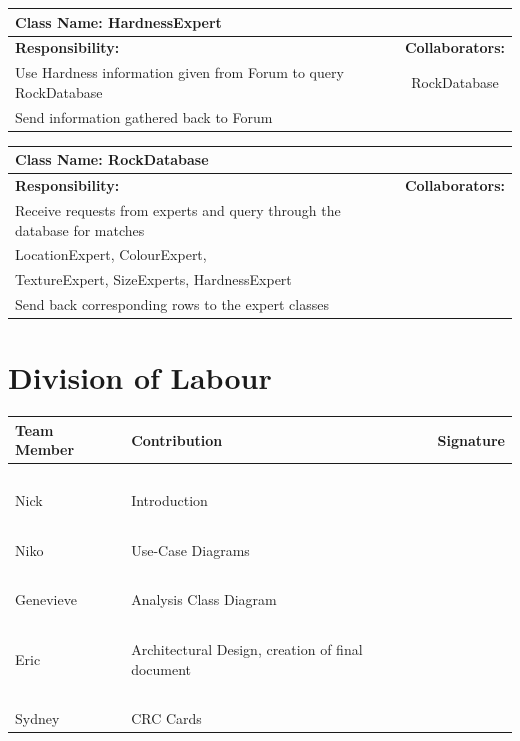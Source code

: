 \documentclass[titlepage]{article}
\begin{document}
\begin{table}[!ht]
	\centering
	\begin{tabular}{| p{8cm} | c |} \hline 
		\multicolumn{2}{|l|}{\textbf{Class Name: HardnessExpert}} \\ \hline
		\textbf{Responsibility:} & \textbf{Collaborators:} \\ \hline
		Use Hardness information given from Forum to query RockDatabase & RockDatabase\\ \hline
		Send information gathered back to Forum & \\ \hline
	\end{tabular}
\end{table}

\begin{table}[!ht]
	\centering
	\begin{tabular}{| p{4cm} | c |} \hline 
		\multicolumn{2}{|l|}{\textbf{Class Name: RockDatabase}} \\ \hline
		\textbf{Responsibility:} & \textbf{Collaborators:} \\ \hline
		Receive requests from experts and query through the database for matches & \pbox{15cm}{~\\LocationExpert, ColourExpert,\\TextureExpert, SizeExperts, HardnessExpert}\\ \hline
		Send back corresponding rows to the expert classes & \\ \hline
	\end{tabular}
\end{table}
\vfill


\newpage
\appendix
\section{Division of Labour}
\begin{center}
\begin{tabular}[!htbp]{| p{6cm} | p{6cm} | p{4cm} |} \hline
	\textbf{Team Member}	&\textbf{Contribution} 						& \textbf{Signature}	\\ \hline
	~					&~										&				\\
	Nick					&Introduction								&				\\ \hline
	~					&~										&				\\
	Niko					&Use-Case Diagrams						&				\\ \hline
	~					&										&				\\
	Genevieve			&Analysis Class Diagram						&				\\ \hline
	~					&										&				\\
	Eric					&Architectural Design, creation of final document	&				\\ \hline
	~					&										&				\\
	Sydney				&CRC Cards								&				\\ \hline
\end{tabular}
\end{center}
\end{document}
